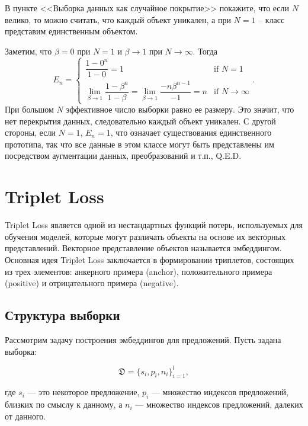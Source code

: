 \begin{problem}
    В пункте <<Выборка данных как случайное покрытие>>  покажите, что если $N$ велико, то можно считать, что каждый объект уникален, а при $N=1$ -- класс представим единственным объектом.
\end{problem}

\begin{solution}
    Заметим, что $\beta=0$ при $N=1$ и $\beta \to 1$ при $N \to \infty$. Тогда
    \[
        E_n=\begin{cases}
            \dfrac{1-0^n}{1-0}=1 & \text{if } N=1 \\
            \lim\limits_{\beta \to 1}\dfrac{1-\beta^n}{1-\beta}=\lim\limits_{\beta \to 1}\dfrac{-n\beta^{n-1}}{-1}=n & \text{if } N \to \infty
        \end{cases}.
    \]
    При большом $N$ эффективное число выборки равно ее размеру. Это значит, что нет перекрытия данных, следовательно каждый объект уникален. С другой стороны, если $N=1$, $E_n=1$, что означает существования единственного прототипа, так что все данные в этом классе могут быть представлены им посредством аугментации данных, преобразований и т.п., Q.E.D.
\end{solution}


\section*{Triplet Loss}

Triplet Loss является одной из нестандартных функций потерь, используемых для обучения моделей, которые могут различать объекты на основе их векторных представлений. Векторное представление объектов называется эмбеддингом. Основная идея Triplet Loss заключается в формировании триплетов, состоящих из трех элементов: анкерного примера (anchor), положительного примера (positive) и отрицательного примера (negative).

\subsection*{Структура выборки}

Рассмотрим задачу построения эмбеддингов для предложений. Пусть задана выборка:

$$
\mathfrak{D} = \{s_i, p_i, n_i\}_{i=1}^{l},
$$

где $s_i$ — это некоторое предложение, $p_i$ — множество индексов предложений, близких по смыслу к данному, а $n_i$ — множество индексов предложений, далеких от данного.

